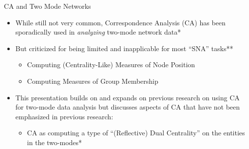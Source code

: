 \documentclass[
  ignorenonframetext,
]{beamer}
\providecommand{\tightlist}{%
  \setlength{\itemsep}{0pt}\setlength{\parskip}{0pt}}\usepackage{longtable,booktabs,array}
\begin{document}
\begin{frame}{CA and Two Mode Networks}
\protect\hypertarget{ca-and-two-mode-networks-2}{}
\begin{itemize}
\tightlist
\item
  While still not very common, Correspondence Analysis (CA) has been
  sporadically used in \emph{analyzing} two-mode network data*
\item
  But criticized for being limited and inapplicable for most ``SNA''
  tasks**

  \begin{itemize}
  \tightlist
  \item
    Computing (Centrality-Like) Measures of Node Position
  \item
    Computing Measures of Group Membership
  \end{itemize}
\item
  This presentation builds on and expands on previous research on using
  CA for two-mode data analysis but discusses aspects of CA that have
  not been emphasized in previous research:

  \begin{itemize}
  \tightlist
  \item
    CA as computing a type of ``(Reflective) Dual Centrality'' on the
    entities in the two-modes*
  \end{itemize}
\end{itemize}

\end{frame}
\end{document}
